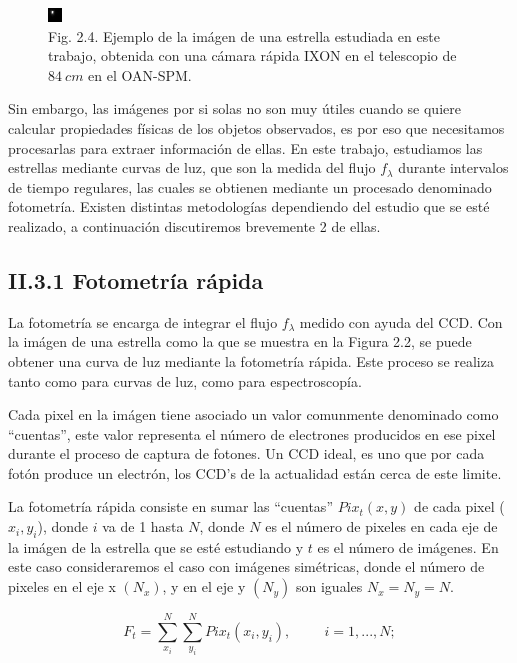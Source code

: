 \begin{figure}[h!]
  \centering
    \includegraphics[scale=8]{./figures/wasp74b.png}
   \caption{Fig. 2.4. Ejemplo de la imágen de una estrella estudiada en este trabajo, obtenida con una cámara rápida IXON en el telescopio de $84~cm$ en el OAN-SPM.}
    \label{fig_2_4_wasp74b}
\end{figure}

Sin embargo, las imágenes por si solas no son muy útiles cuando se quiere calcular propiedades físicas de los objetos observados, es por eso que necesitamos procesarlas para extraer información de ellas. En este trabajo, estudiamos las estrellas mediante curvas de luz, que son la medida del flujo $f_{\lambda}$ durante intervalos de tiempo regulares, las cuales se obtienen mediante un procesado denominado fotometría. Existen distintas metodologías dependiendo del estudio que se esté realizado, a continuación discutiremos brevemente 2 de ellas.

\subsection*{II.3.1 Fotometría rápida}

La fotometría se encarga de integrar el flujo $f_{\lambda}$ medido con ayuda del CCD. Con la imágen de una estrella como la que se muestra en la Figura 2.2, se puede obtener una curva de luz mediante la fotometría rápida. Este proceso se realiza tanto como para curvas de luz, como para espectroscopía.

Cada pixel en la imágen tiene asociado un valor comunmente denominado como ``cuentas'', este valor representa el número de electrones producidos en ese pixel durante el proceso de captura de fotones. Un CCD ideal, es uno que por cada fotón produce un electrón, los CCD's de la actualidad están cerca de este limite.

La fotometría rápida consiste en sumar las ``cuentas'' $Pix_{t}(x,y) $ de cada pixel ($x_{i},y_{i}$), donde $ i $ va de 1 hasta $ N $, donde $ N $ es el número de pixeles en cada eje de la imágen de la estrella que se esté estudiando y $ t $ es el número de imágenes. En este caso consideraremos el caso con imágenes simétricas, donde el número de pixeles en el eje x $(N_{x})$, y en el eje y $(N_{y})$ son iguales $N_{x}=N_{y}=N$. 

\begin{equation}
  \displaystyle F_{t} = \sum_{x_{i}}^{N} \sum_{y_{i}}^{N} Pix_{t}(x_{i},y_{i}),\hspace{1cm}i=1,...,N;
\end{equation}

